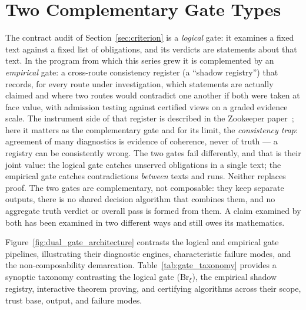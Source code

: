 \documentclass[11pt,a4paper]{article}
\begin{document}
\section{Two Complementary Gate Types}\label{sec:gates}

The contract audit of Section~\ref{sec:criterion} is a \emph{logical} gate:
it examines a fixed text against a fixed list of obligations, and its
verdicts are statements about that text. In the program from which this
series grew it is complemented by an \emph{empirical} gate: a cross-route
consistency register (a ``shadow registry'') that records, for every route
under investigation, which statements are actually claimed and where two
routes would contradict one another if both were taken at face value, with
admission testing against certified views on a graded evidence scale. The
instrument side of that register is described in the Zookeeper
paper~\cite{zookeeper}; here it matters as the complementary gate and for
its limit, the \emph{consistency trap}: agreement of many diagnostics is
evidence of coherence, never of truth --- a registry can be consistently
wrong. The two gates fail differently, and that is their joint value: the
logical gate catches unserved obligations in a single text; the empirical
gate catches contradictions \emph{between} texts and runs. Neither replaces
proof. The two gates are complementary, not composable: they keep separate
outputs, there is no shared decision algorithm that combines them, and no
aggregate truth verdict or overall pass is formed from them. A claim examined
by both has been examined in two different ways and still owes its mathematics.

Figure~\ref{fig:dual_gate_architecture} contrasts the logical and empirical gate pipelines, illustrating their diagnostic engines, characteristic failure modes, and the non-composability demarcation. Table~\ref{tab:gate_taxonomy} provides a synoptic taxonomy contrasting the logical gate ($\mathrm{Br}_\xi$), the empirical shadow registry, interactive theorem proving, and certifying algorithms across their scope, trust base, output, and failure modes.
\end{document}
